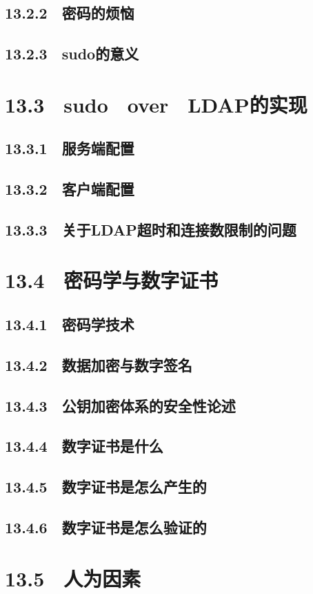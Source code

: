 \documentclass[12pt,UTF8]{ctexbook}
\begin{document}
{\subsection{13.2.2　密码的烦恼}
\subsection{13.2.3　sudo的意义}
\section{13.3　sudo　over　LDAP的实现}
\subsection{13.3.1　服务端配置}
\subsection{13.3.2　客户端配置}
\subsection{13.3.3　关于LDAP超时和连接数限制的问题}
\section{13.4　密码学与数字证书}
\subsection{13.4.1　密码学技术}
\subsection{13.4.2　数据加密与数字签名}
\subsection{13.4.3　公钥加密体系的安全性论述}
\subsection{13.4.4　数字证书是什么}
\subsection{13.4.5　数字证书是怎么产生的}
\subsection{13.4.6　数字证书是怎么验证的}
\section{13.5　人为因素}
}
\end{document}
